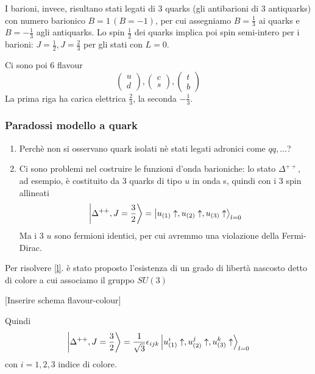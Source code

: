 \documentclass[10pt,a4paper]{article}
\theoremstyle{definition}
\begin{document}
I barioni, invece, risultano stati legati di 3 quarks (gli antibarioni di 3 antiquarks) con numero barionico \(B = 1\, (B = -1)\), per cui assegniamo \(B = \frac13\) ai quarks e \(B = -\frac13\) agli antiquarks. Lo spin \(\frac12\) dei quarks implica poi spin semi-intero per i barioni: \(J = \frac12, J = \frac23\) per gli stati con \(L = 0\).

Ci sono poi 6 flavour
\[
\begin{pmatrix}
u \\ d    
\end{pmatrix}
,
\begin{pmatrix}
    c \\ s
\end{pmatrix}
,
\begin{pmatrix}
    t \\ b 
\end{pmatrix}
\]
La prima riga ha carica elettrica \(\frac23\), la seconda \(-\frac13\).

\subsubsection{Paradossi modello a quark}
\begin{enumerate}
    \item Perchè non si osservano quark isolati nè stati legati adronici come $qq, \dots$? \label{conf}
    \item Ci sono problemi nel costruire le funzioni d'onda barioniche: lo stato \(\Delta^{++}\), ad esempio, è costituito da 3 quarks di tipo \(u\) in onda s, quindi con i 3 spin allineati
    \[
    \ket{\Delta^{++}, J = \frac32} = \ket{u_{(1)}\uparrow, u_{(2)}\uparrow, u_{(3)}\uparrow}_{l = 0} 
    \] 
    Ma i 3 \(u\) sono fermioni identici, per cui avremmo una violazione della Fermi-Dirac. \label{l}
\end{enumerate}
Per risolvere \ref{l}. è stato proposto l'esistenza di un grado di libertà nascosto detto di colore a cui associamo il gruppo $SU(3)$

[Inserire schema flavour-colour]

Quindi 
\[
    \ket{\Delta^{++}, J = \frac32} = \frac{1}{\sqrt{3}}\epsilon_{ijk} \ket{u_{(1)}^i\uparrow, u_{(2)}^j\uparrow, u_{(3)}^k\uparrow}_{l = 0} 
\] 
con \(i = 1, 2, 3\) indice di colore.
\end{document}
